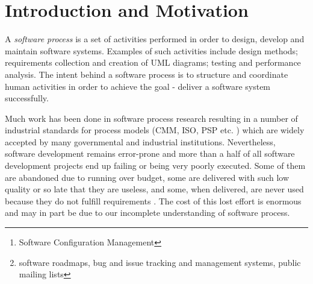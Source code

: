 \documentclass{sig-alternate}
\begin{document}
\begin{abstract}
A process defines a set of routines which allow one to organize, manage and improve activities in order to reach a goal. With expert intuition and a-priori knowledge, software processes have been modeled for a long time, resulting in the Waterfall, Spiral and other development models. Later, with the wide use of SCM \footnote{Software Configuration Management} systems and the public availability of primitive software process artifact trails \footnote{software roadmaps, bug and issue tracking and management systems, public mailing lists}, formal methods such as Petri Nets, State Machines and others have been applied to the problem of recurrent process discovery and control. Recent advances in metrics effort, increased use of continuous integration, and extensive documentation of the performed process make information-rich fine-grained software process artifacts trails available for analysis. This fine-grained data has the potential to shed new light on the software process. In this work I propose to investigate an automated technique for the discovery and characterization of recurrent behaviors in software development - ``programming habits'' either on an individual or a team level.
\end{abstract}




\section{Introduction and Motivation}
A \textit{software process} is a set of activities performed in order to design, develop and maintain software systems. Examples of such activities include design methods; requirements collection and creation of UML diagrams; testing and performance analysis. The intent behind a software process is to structure and coordinate human activities in order to achieve the goal - deliver a software system successfully. 

Much work has been done in software process research resulting in a number of industrial standards for process models (CMM, ISO, PSP etc. \cite{citeulike:5043104}) which are widely accepted by many governmental and industrial institutions. Nevertheless, software development remains error-prone and more than a half of all software development projects end up failing or being very poorly executed. Some of them are abandoned due to running over budget, some are delivered with such low quality or so late that they are useless, and some, when delivered, are never used because they do not fulfill requirements \cite{citeulike:7351135}. The cost of this lost effort is enormous and may in part be due to our incomplete understanding of software process.
\end{document}
